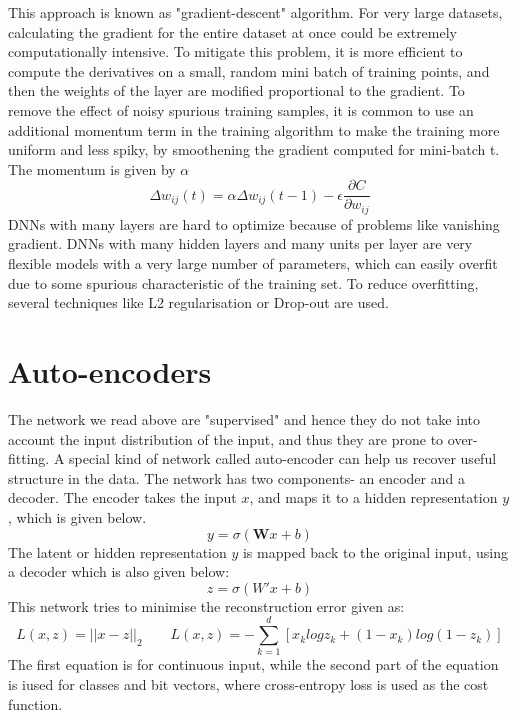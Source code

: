 \documentclass[a4paper,11pt]{kth-mag}
\begin{document}
This approach is known as "gradient-descent" algorithm. For very large datasets, calculating the gradient for the entire dataset at once could be extremely computationally intensive. To mitigate this problem, it is more efficient to compute the derivatives on a small, random mini batch of training points, and then the weights of the layer are modified proportional to the gradient. To remove the effect of noisy spurious training samples, it is common to use an additional momentum term in the training algorithm to make the training more uniform and less spiky, by smoothening the gradient computed for mini-batch t. The momentum is given by $\alpha$
\begin{equation}
\Delta{}w_{ij}(t) = \alpha \Delta w_{ij}(t-1) - \epsilon \frac{\partial{C}}{\partial{w_{ij}}}
\end{equation}
DNNs with many layers are hard to optimize because of problems like vanishing gradient. 
DNNs with many hidden layers and many units per layer are very flexible models with a very large number of parameters, which can easily overfit due to some spurious characteristic of the training set. To reduce overfitting, several techniques like L2 regularisation or Drop-out are used. 

\section{Auto-encoders}
The network we read above are "supervised" and hence they do not take into account the input distribution of the input, and thus they are prone to over-fitting. A special kind of network called auto-encoder can help us recover useful structure in the data. The network has two components- an encoder and a decoder. The encoder takes the input $x$, and maps it to a hidden representation $y$, which is given below.
\begin{equation}
y = \sigma(\textbf{W}x + b)
\end{equation}
The latent or hidden representation $y$ is mapped back to the original input, using a decoder which is also given below:
\begin{equation}
 z = \sigma(W'x + b)
\end{equation}
This network tries to minimise the reconstruction error given as:
\begin{equation}
L(x,z) = || x - z ||_{2} 	\qquad 	L(x,z) = -\sum_{k=1}^{d}[x_{k}logz_{k} + (1 - x_{k})log(1 - z_{k})]
\end{equation}
The first equation is for continuous input, while the second part of the equation is iused for classes and bit vectors, where cross-entropy loss is used as the cost function.
\end{document}
